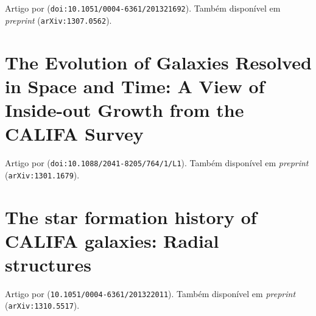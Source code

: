 Artigo por \cite{CidFernandes2014} (\texttt{doi:10.1051/0004-6361/201321692}).
Também disponível em {\em preprint} (\texttt{arXiv:1307.0562}).

\cleardoublepage





\section{The Evolution of Galaxies Resolved in Space and Time: A View of
Inside-out Growth from the CALIFA Survey}
\label{apendice:InsideOut}

Artigo por \cite{Perez2013} (\texttt{doi:10.1088/2041-8205/764/1/L1}).
Também disponível em {\em preprint} (\texttt{arXiv:1301.1679}).

\cleardoublepage





\section{The star formation history of CALIFA galaxies: Radial structures}
\label{apendice:RadStruct}

Artigo por \cite{GonzalezDelgado2014a} (\texttt{10.1051/0004-6361/201322011}).
Também disponível em {\em preprint} (\texttt{arXiv:1310.5517}).

\cleardoublepage




